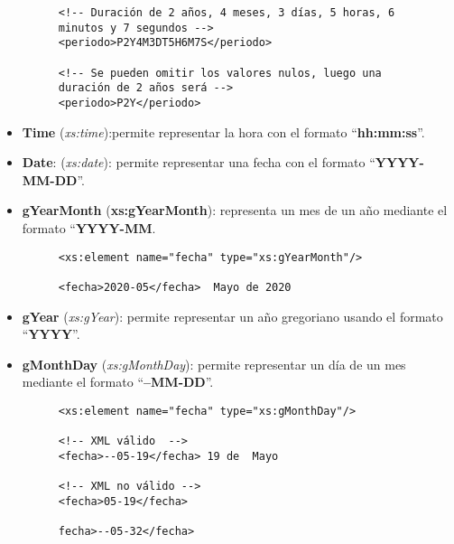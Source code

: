 \begin{itemize}
\begin{figure}[h]
\begin{tcolorbox}[sharp corners, colback=yellow!30, colframe=white!20]
\begin{verbatim}
<!-- Duración de 2 años, 4 meses, 3 días, 5 horas, 6 minutos y 7 segundos -->
<periodo>P2Y4M3DT5H6M7S</periodo>

<!-- Se pueden omitir los valores nulos, luego una duración de 2 años será -->
<periodo>P2Y</periodo>
            \end{verbatim}
        \end{tcolorbox}
    \end{figure}

    \item \textbf{Time} (\textit{xs:time}):permite representar la hora con el formato ``\textbf{hh:mm:ss}''.
    \item \textbf{Date}: (\textit{xs:date}): permite representar una fecha con el formato ``\textbf{YYYY-MM-DD}''.
    \item \textbf{gYearMonth} (\textbf{xs:gYearMonth}): representa un mes de un año mediante el formato ``\textbf{YYYY-MM}.

    \begin{figure}[H]
        \begin{tcolorbox}[sharp corners, colback=yellow!30, colframe=white!20]
            \scriptsize
            \begin{verbatim}
<xs:element name="fecha" type="xs:gYearMonth"/>

<fecha>2020-05</fecha>  Mayo de 2020
            \end{verbatim}
        \end{tcolorbox}
    \end{figure}

    \item \textbf{gYear} (\textit{xs:gYear}): permite representar un año  gregoriano usando el formato ``\textbf{YYYY}''.

    \item \textbf{gMonthDay} (\textit{xs:gMonthDay}): permite representar un día de un mes mediante el formato ``\textbf{--MM-DD}''.

    \begin{figure}[h]
        \begin{tcolorbox}[sharp corners, colback=yellow!30, colframe=white!20]
            \scriptsize
            \begin{verbatim}
<xs:element name="fecha" type="xs:gMonthDay"/>

<!-- XML válido  -->
<fecha>--05-19</fecha> 19 de  Mayo

<!-- XML no válido -->
<fecha>05-19</fecha>

fecha>--05-32</fecha>
            \end{verbatim}
        \end{tcolorbox}
    \end{figure}


\end{itemize}
